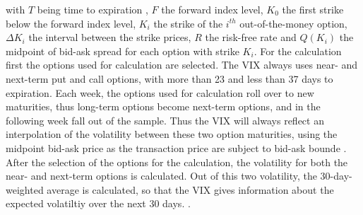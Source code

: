 with $T$ being time to expiration , $F$ the forward index level, $K_{0}$ the first strike below the forward index level, $K_{i}$ the strike of the $i^{th}$ out-of-the-money option, $\Delta K_{i}$ the interval between the strike prices, $R$ the risk-free rate and $Q(K_{i})$ the midpoint of bid-ask spread for each option with strike $K_{i}$. For the calculation first the options used for calculation are selected. The \ac{VIX} always uses near- and next-term put and call options, with more than 23 and less than 37 days to expiration. Each week, the options used for calculation roll over to new maturities, thus long-term options become next-term options, and in the following week fall out of the sample. Thus the \ac{VIX} will always reflect an interpolation of the volatility between these two option maturities, using the midpoint bid-ask price as the transaction price are subject to bid-ask bounde \parencite{poon2003}. After the selection of the options for the calculation, the volatility for both the near- and next-term options is calculated. Out of this two volatility, the 30-day-weighted average is calculated, so that the \ac{VIX} gives information about the expected volatiltiy over the next 30 days. \parencite{exchange2009}. 









